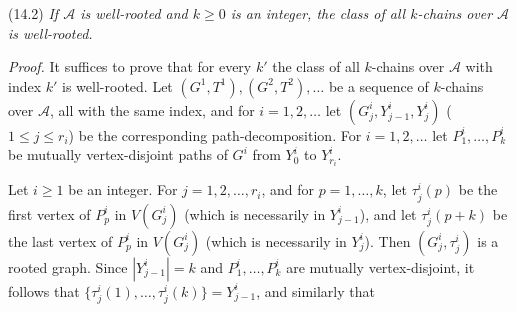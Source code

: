 \stmt
(14.2) \textit{If $\mathcal{A}$ is well-rooted and $k \ge 0$ is an integer, the class of all $k$-chains over $\mathcal{A}$ is well-rooted.}

\textit{Proof.} It suffices to prove that for every $k'$ the class of all $k$-chains over $\mathcal{A}$ with index $k'$ is well-rooted. Let $(G^1, T^1), (G^2, T^2), \dots$ be a sequence of $k$-chains over $\mathcal{A}$, all with the same index, and for $i = 1, 2, \dots$ let $(G^i_j, Y^i_{j-1}, Y^i_j)$ ($1 \le j \le r_i$) be the corresponding path-decomposition. For $i = 1, 2, \dots$ let $P^i_1, \dots, P^i_k$ be mutually vertex-disjoint paths of $G^i$ from $Y^i_0$ to $Y^i_{r_i}$.

Let $i \ge 1$ be an integer. For $j = 1, 2, \dots, r_i$, and for $p = 1, \dots, k$, let $\tau^i_j(p)$ be the first vertex of $P^i_p$ in $V(G^i_j)$ (which is necessarily in $Y^i_{j-1}$), and let $\tau^i_j(p+k)$ be the last vertex of $P^i_p$ in $V(G^i_j)$ (which is necessarily in $Y^i_j$). Then $(G^i_j, \tau^i_j)$ is a rooted graph. Since $|Y^i_{j-1}| = k$ and $P^i_1, \dots, P^i_k$ are mutually vertex-disjoint, it follows that $\{\tau^i_j(1), \dots, \tau^i_j(k)\} = Y^i_{j-1}$, and similarly that
